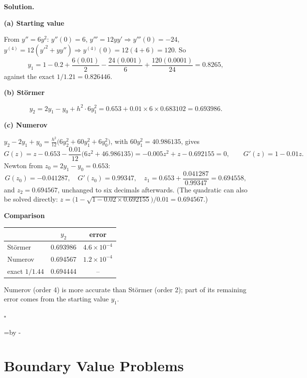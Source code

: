 \documentclass[11pt,a4paper]{article}
\makeatletter
\newcommand{\Needspace}[1]{\par\penalty-100\begingroup
  \dimen@=#1\relax
  \dimen@ii=\pagegoal\advance\dimen@ii by -\pagetotal
  \ifdim\dimen@>\dimen@ii\ifdim\dimen@ii>\z@\vfil\fi\break\fi
  \endgroup}
\newenvironment{solution}
  {\par\noindent\textbf{Solution.}\par\nobreak}
  {\par\nobreak\noindent\hfill\(\square\)\par}
\newcommand{\step}[1]{\par\addvspace{0.5em}\noindent\textbf{#1}\par\nobreak}
\makeatother
\begin{document}
\begin{solution}
\step{(a) Starting value}
From \(y''=6y^2\): \(y''(0)=6\), \(y'''=12yy'\Rightarrow y'''(0)=-24\),
\(y^{(4)}=12(y'^2+yy'')\Rightarrow y^{(4)}(0)=12(4+6)=120\).  So
\[
  y_1=1-0.2+\frac{6(0.01)}2-\frac{24(0.001)}6+\frac{120(0.0001)}{24}
  =0.8265,
\]
against the exact \(1/1.21=0.826446\).

\step{(b) Störmer}
\[
  y_2=2y_1-y_0+h^2\cdot6y_1^2=0.653+0.01\times6\times0.683102=0.693986 .
\]

\step{(c) Numerov}
\(y_2-2y_1+y_0=\frac{h^2}{12}\bigl(6y_2^2+60y_1^2+6y_0^2\bigr)\), with
\(60y_1^2=40.986135\), gives
\[
  G(z)=z-0.653-\frac{0.01}{12}\bigl(6z^2+46.986135\bigr)
      =-0.005z^2+z-0.692155=0,
  \qquad G'(z)=1-0.01z .
\]
Newton from \(z_0=2y_1-y_0=0.653\):
\[
  G(z_0)=-0.041287,\quad G'(z_0)=0.99347,\quad
  z_1=0.653+\frac{0.041287}{0.99347}=0.694558,
\]
and \(z_2=0.694567\), unchanged to six decimals afterwards.  (The
quadratic can also be solved directly:
\(z=\bigl(1-\sqrt{1-0.02\times0.692155}\bigr)/0.01=0.694567\).)

\step{Comparison}
\begin{center}
\begin{tabular}{@{}lcc@{}}
\toprule
 & \(y_2\) & error\\
\midrule
Störmer & 0.693986 & \(4.6\times10^{-4}\)\\
Numerov & 0.694567 & \(1.2\times10^{-4}\)\\
exact \(1/1.44\) & 0.694444 & --\\
\bottomrule
\end{tabular}
\end{center}
Numerov (order 4) is more accurate than Störmer (order 2); part of
its remaining error comes from the starting value \(y_1\).
\end{solution}

\Needspace{32\baselineskip}
\section{Boundary Value Problems}
\end{document}
